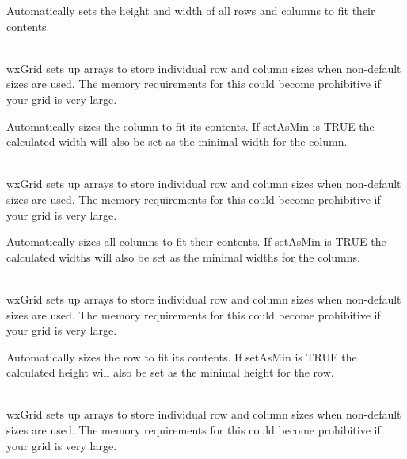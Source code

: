Automatically sets the height and width of all rows and columns to fit their contents.

\\
wxGrid sets up arrays to store individual row and column sizes when non-default sizes are used.
The memory requirements for this could become prohibitive if your grid is very large. 

\label{wxgridautosizecolumn}


Automatically sizes the column to fit its contents. If setAsMin is TRUE the calculated width will
also be set as the minimal width for the column.

\\
wxGrid sets up arrays to store individual row and column sizes when non-default sizes are used.
The memory requirements for this could become prohibitive if your grid is very large. 

\label{wxgridautosizecolumns}


Automatically sizes all columns to fit their contents. If setAsMin is TRUE the calculated widths will
also be set as the minimal widths for the columns.

\\
wxGrid sets up arrays to store individual row and column sizes when non-default sizes are used.
The memory requirements for this could become prohibitive if your grid is very large. 

\label{wxgridautosizerow}


Automatically sizes the row to fit its contents. If setAsMin is TRUE the calculated height will
also be set as the minimal height for the row.

\\
wxGrid sets up arrays to store individual row and column sizes when non-default sizes are used.
The memory requirements for this could become prohibitive if your grid is very large. 

\label{wxgridautosizerows}


